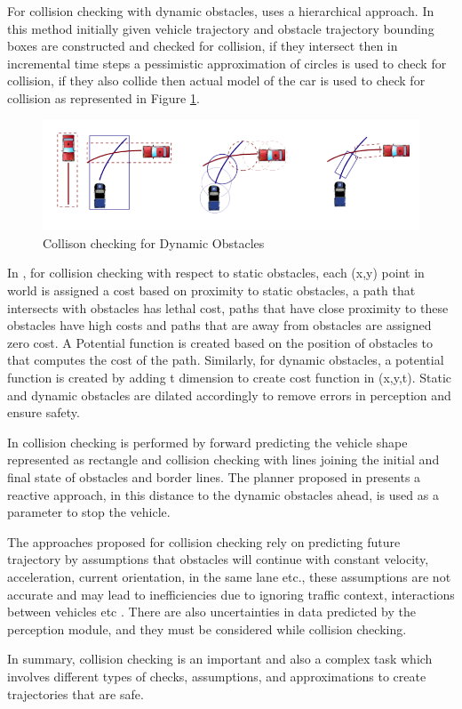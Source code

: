 For collision checking with dynamic obstacles, \cite{kolski_thesis} uses a hierarchical approach. In this method initially given vehicle trajectory and obstacle trajectory bounding boxes are constructed and checked for collision, if they intersect then in incremental time steps a pessimistic approximation of circles is used to check for collision, if they also collide then actual model of the car is used to check for collision as represented in Figure \ref{kolskidynamicobst}.

\begin{figure}
	\centering
	\includegraphics[width=1.0\textwidth]{Images/related_work/kolskidynamicobstacles.png}
	\caption{Collison checking for Dynamic Obstacles \cite{kolski_thesis}}
	\label{kolskidynamicobst}
\end{figure} 

In \cite{cmu_parallel_thesis}, for collision checking with respect to static obstacles, each (x,y) point in world is assigned a cost based on proximity to static obstacles, a path that intersects with obstacles has lethal cost, paths that have close proximity to these obstacles have high costs and paths that are away from obstacles are assigned zero cost. A Potential function is created based on the position of obstacles to that computes the cost of the path. Similarly, for dynamic obstacles, a potential function is created by adding t dimension to create cost function in (x,y,t). Static and dynamic obstacles are dilated accordingly to remove errors in perception and ensure safety.


In \cite{rrt_star} collision checking is performed by forward predicting the vehicle shape represented as rectangle and collision checking with lines joining the initial and final state of obstacles and border lines. The planner proposed in \cite{volvo_reactive_traj} presents a reactive approach, in this distance to the dynamic obstacles ahead, is used as a parameter to stop the vehicle.

The approaches proposed for collision checking rely on predicting future trajectory by assumptions that obstacles will continue with constant velocity, acceleration, current orientation, in the same lane etc., these assumptions are not accurate and may lead to inefficiencies due to ignoring traffic context, interactions between vehicles etc \cite{motion_planning_techniques}. There are also uncertainties in data predicted by the perception module, and they must be considered while collision checking.

In summary, collision checking is an important and also a complex task which involves different types of checks, assumptions, and approximations to create trajectories that are safe.


